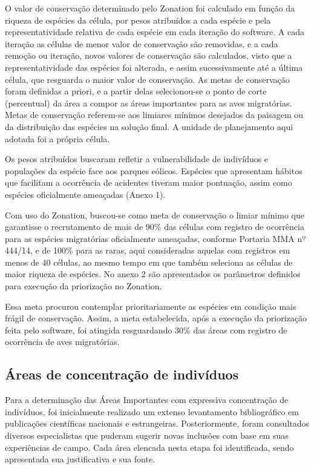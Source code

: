 \documentclass[
]{scrbook}
\begin{document}
O valor de conservação determinado pelo Zonation foi calculado em função da riqueza de espécies da célula, por pesos atribuídos a cada espécie e pela representatividade relativa de cada espécie em cada iteração do software. A cada iteração as células de menor valor de conservação são removidas, e a cada remoção ou iteração, novos valores de conservação são calculados, visto que a representatividade das espécies foi alterada, e assim sucessivamente até a última célula, que resguarda o maior valor de conservação. As metas de conservação foram definidas a priori, e a partir delas selecionou-se o ponto de corte (percentual) da área a compor as áreas importantes para as aves migratórias. Metas de conservação referem-se aos limiares mínimos desejados da paisagem ou da distribuição das espécies na solução final. A unidade de planejamento aqui adotada foi a própria célula.

Os pesos atribuídos buscaram refletir a vulnerabilidade de indivíduos e populações da espécie face aos parques eólicos. Espécies que apresentam hábitos que facilitam a ocorrência de acidentes tiveram maior pontuação, assim como espécies oficialmente ameaçadas (Anexo 1).

Com uso do Zonation, buscou-se como meta de conservação o limiar mínimo que garantisse o recrutamento de mais de 90\% das células com registro de ocorrência para as espécies migratórias oficialmente ameaçadas, conforme Portaria MMA nº 444/14, e de 100\% para as raras, aqui consideradas aquelas com registros em menos de 40 células, ao mesmo tempo em que também seleciona as células de maior riqueza de espécies. No anexo 2 são apresentados os parâmetros definidos para execução da priorização no Zonation.

Essa meta procurou contemplar prioritariamente as espécies em condição mais frágil de conservação. Assim, a meta estabelecida, após a execução da priorização feita pelo software, foi atingida resguardando 30\% das áreas com registro de ocorrência de aves migratórias.

\hypertarget{areas-concentracao}{%
\subsection{Áreas de concentração de indivíduos}\label{areas-concentracao}}

Para a determinação das Áreas Importantes com expressiva concentração de indivíduos, foi inicialmente realizado um extenso levantamento bibliográfico em publicações científicas nacionais e estrangeiras. Posteriormente, foram consultados diversos especialistas que puderam sugerir novas inclusões com base em suas experiências de campo. Cada área elencada nesta etapa foi identificada, sendo apresentada sua justificativa e sua fonte.
\end{document}

